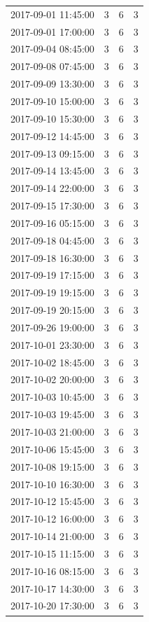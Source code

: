\begin{tabular}{lrrr}
2017-09-01 11:45:00 & 3 & 6 & 3 \\
2017-09-01 17:00:00 & 3 & 6 & 3 \\
2017-09-04 08:45:00 & 3 & 6 & 3 \\
2017-09-08 07:45:00 & 3 & 6 & 3 \\
2017-09-09 13:30:00 & 3 & 6 & 3 \\
2017-09-10 15:00:00 & 3 & 6 & 3 \\
2017-09-10 15:30:00 & 3 & 6 & 3 \\
2017-09-12 14:45:00 & 3 & 6 & 3 \\
2017-09-13 09:15:00 & 3 & 6 & 3 \\
2017-09-14 13:45:00 & 3 & 6 & 3 \\
2017-09-14 22:00:00 & 3 & 6 & 3 \\
2017-09-15 17:30:00 & 3 & 6 & 3 \\
2017-09-16 05:15:00 & 3 & 6 & 3 \\
2017-09-18 04:45:00 & 3 & 6 & 3 \\
2017-09-18 16:30:00 & 3 & 6 & 3 \\
2017-09-19 17:15:00 & 3 & 6 & 3 \\
2017-09-19 19:15:00 & 3 & 6 & 3 \\
2017-09-19 20:15:00 & 3 & 6 & 3 \\
2017-09-26 19:00:00 & 3 & 6 & 3 \\
2017-10-01 23:30:00 & 3 & 6 & 3 \\
2017-10-02 18:45:00 & 3 & 6 & 3 \\
2017-10-02 20:00:00 & 3 & 6 & 3 \\
2017-10-03 10:45:00 & 3 & 6 & 3 \\
2017-10-03 19:45:00 & 3 & 6 & 3 \\
2017-10-03 21:00:00 & 3 & 6 & 3 \\
2017-10-06 15:45:00 & 3 & 6 & 3 \\
2017-10-08 19:15:00 & 3 & 6 & 3 \\
2017-10-10 16:30:00 & 3 & 6 & 3 \\
2017-10-12 15:45:00 & 3 & 6 & 3 \\
2017-10-12 16:00:00 & 3 & 6 & 3 \\
2017-10-14 21:00:00 & 3 & 6 & 3 \\
2017-10-15 11:15:00 & 3 & 6 & 3 \\
2017-10-16 08:15:00 & 3 & 6 & 3 \\
2017-10-17 14:30:00 & 3 & 6 & 3 \\
2017-10-20 17:30:00 & 3 & 6 & 3 \\

\end{tabular}
